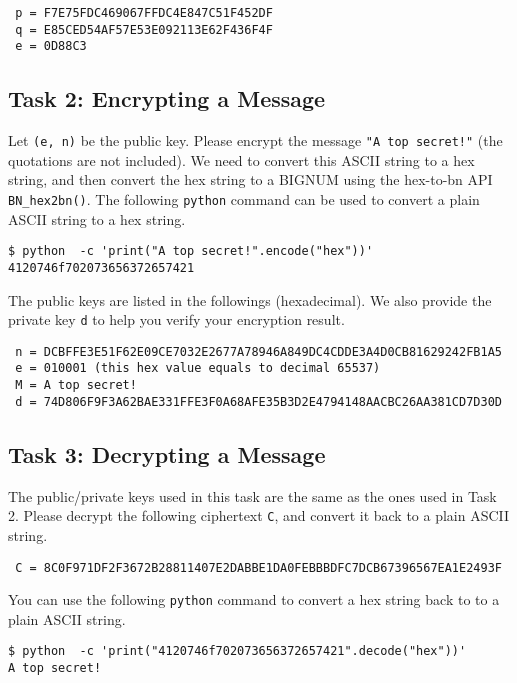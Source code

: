 \begin{lstlisting}
 p = F7E75FDC469067FFDC4E847C51F452DF
 q = E85CED54AF57E53E092113E62F436F4F
 e = 0D88C3 
\end{lstlisting}
 

\subsection{Task 2: Encrypting a Message}

Let \texttt{(e, n)} be the public key. Please encrypt the message 
\texttt{"A top secret!"} (the quotations are not included).  
We need to convert this ASCII string to a hex string, and then
convert the hex string to a BIGNUM using the hex-to-bn API \texttt{BN\_hex2bn()}. 
The following \texttt{python} command can be used 
to convert a plain ASCII string to a hex string. 

\begin{lstlisting}
$ python  -c 'print("A top secret!".encode("hex"))'
4120746f702073656372657421
\end{lstlisting}


The public keys are listed in the followings (hexadecimal).  We also provide the private key \texttt{d} 
 to help you verify your encryption
result. 

\begin{lstlisting}
 n = DCBFFE3E51F62E09CE7032E2677A78946A849DC4CDDE3A4D0CB81629242FB1A5
 e = 010001 (this hex value equals to decimal 65537)
 M = A top secret!
 d = 74D806F9F3A62BAE331FFE3F0A68AFE35B3D2E4794148AACBC26AA381CD7D30D 
\end{lstlisting}



\subsection{Task 3: Decrypting a Message}

The public/private keys used in this task are the same as the ones used in Task 2. 
Please decrypt the following ciphertext \texttt{C}, and convert it back to 
a plain ASCII string.

\begin{lstlisting}
 C = 8C0F971DF2F3672B28811407E2DABBE1DA0FEBBBDFC7DCB67396567EA1E2493F
\end{lstlisting}


You can use the following \texttt{python} command to convert 
a hex string back to to a plain ASCII string. 
\begin{lstlisting}
$ python  -c 'print("4120746f702073656372657421".decode("hex"))'
A top secret!
\end{lstlisting}

